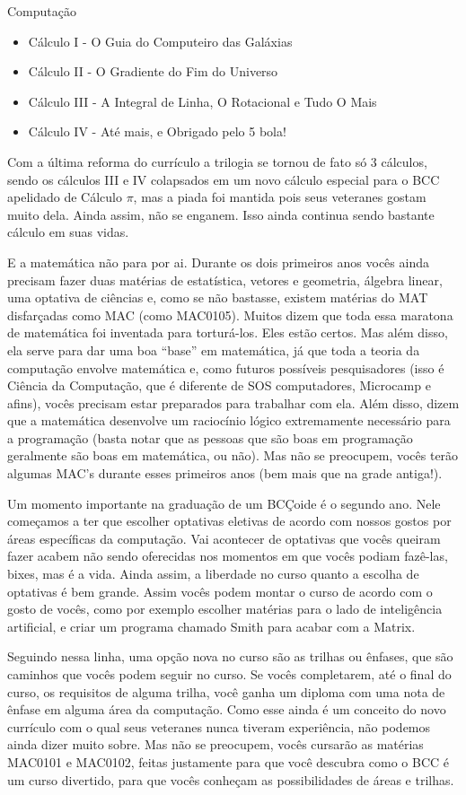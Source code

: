 \begin{subsecao}{Computação}
\begin{itemize}
\item Cálculo I - O Guia do Computeiro das Galáxias
\item Cálculo II - O Gradiente do Fim do Universo
\item Cálculo III - A Integral de Linha, O Rotacional e Tudo O Mais
\item Cálculo IV - Até mais, e Obrigado pelo 5 bola!
\end{itemize}

Com a última reforma do currículo a trilogia se tornou de fato só 3 cálculos,
sendo os cálculos III e IV colapsados em um novo cálculo especial para o BCC 
apelidado de Cálculo $\pi$, mas a piada foi mantida pois seus veteranes gostam muito
dela. Ainda assim, não se enganem. Isso ainda continua sendo bastante cálculo em
suas vidas.

E a matemática não para por ai. Durante os dois primeiros anos vocês ainda
precisam fazer duas matérias de estatística, vetores e geometria, álgebra
linear, uma optativa de ciências e, como se não bastasse, existem matérias do
MAT disfarçadas como MAC (como MAC0105). Muitos dizem que toda essa maratona de
matemática foi inventada para torturá-los. Eles estão certos. Mas além disso,
ela serve para dar uma boa ``base'' em matemática, já que toda a teoria da
computação envolve matemática e, como futuros possíveis pesquisadores (isso é
Ciência da Computação, que é diferente de SOS computadores, Microcamp e afins),
vocês precisam estar preparados para trabalhar com ela. Além disso, dizem que a
matemática desenvolve um raciocínio lógico extremamente necessário para a
programação (basta notar que as pessoas que são boas em programação geralmente
são boas em matemática, ou não). Mas não se preocupem, vocês terão algumas MAC's
durante esses primeiros anos (bem mais que na grade antiga!).

Um momento importante na graduação de um BCÇoide é o segundo ano. Nele começamos
a ter que escolher optativas eletivas de acordo com nossos gostos por áreas
específicas da computação. Vai acontecer de optativas que vocês queiram fazer
acabem não sendo oferecidas nos momentos em que vocês podiam fazê-las, bixes,
mas é a vida. Ainda assim, a liberdade no curso quanto a escolha de optativas é
bem grande. Assim vocês podem montar o curso de acordo com o gosto de vocês,
como por exemplo escolher matérias para o lado de inteligência artificial, e
criar um programa chamado Smith para acabar com a Matrix.

Seguindo nessa linha, uma opção nova no curso são as trilhas ou ênfases, que
são caminhos que vocês podem seguir no curso. Se vocês completarem, até o final
do curso, os requisitos de alguma trilha, você ganha um diploma com uma nota de
ênfase em alguma área da computação. Como esse ainda é um conceito do novo
currículo com o qual seus veteranes nunca tiveram experiência, não podemos
ainda dizer muito sobre. Mas não se preocupem, vocês cursarão as matérias
MAC0101 e MAC0102, feitas justamente para que você descubra como o BCC é um
curso divertido, para que vocês conheçam as possibilidades de áreas e trilhas.


\end{subsecao}

